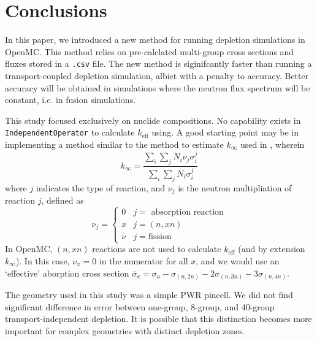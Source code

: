 \section{Conclusions}\label{sec:conclusion}
    In this paper, we introduced a new method for running depletion simulations
    in OpenMC. This method relies on pre-calclated multi-group cross sections
    and fluxes stored in a \verb,.csv, file. The new method is siginifcantly
    faster than running a transport-coupled depletion simulation, albiet with a
    penalty to accuracy. Better accuracy will be obtained in simulations where
    the neutron flux spectrum will be constant, i.e. in fusion simulations.
         
    This study focused exclusively on nuclide compositions. No capability exists
    in \verb.IndependentOperator. to calculate $k_\text{eff}$ using. A good
    starting point may be in implementing a method similar to the method to estimate
    $k_{\infty}$ used in \cite{LOVECKY2014333}, wherein
    \begin{equation}
        k_{\infty} = \frac{\sum_{i} \sum_{j} N_{i} \nu_{j}
        \sigma_{i}^{j}}{\sum_{i}\sum_{j} N_{i} \sigma_{i}^{j}}  
    \end{equation}
    where $j$ indicates the type of reaction, and $\nu_{j}$ is the neutron
    multipliation of reaction $j$, defined as
    \begin{equation}
        \nu_j = \begin{cases}
            0 & j=\text{ absorption reaction}\\
            x & j=(n,xn)\\
            \bar{\nu} & j=\text{fission}
        \end{cases}
    \end{equation}
    In OpenMC, $(n,xn)$ reactions are not used to calculate $k_\text{eff}$ (and
    by extension $k_{\infty}$). In this case, $\nu_{x} = 0$ in the numerator for
    all $x$, and we would use an `effective' aborption cross section
    $\overline{\sigma}_{a} = \sigma_{a} - \sigma_{(n,2n)} - 2\sigma_{(n,3n)} -
    3\sigma_{(n,4n)}$. 

    The geometry used in this study was a simple PWR pincell. We did not find
    significant difference in error between one-group, 8-group, and 40-group
    transport-independent depletion. It is possible that this distinction
    becomes more important for complex geometries with distinct depletion zones.
